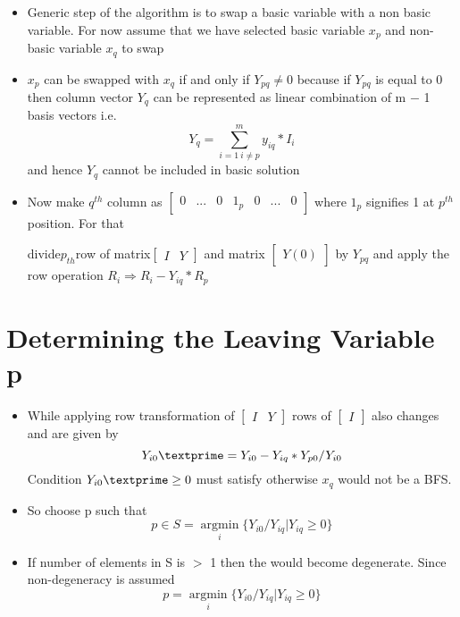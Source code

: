 \documentclass[twoside]{article}
\begin{document}
\begin{itemize}
\item Generic step of the algorithm is to swap a basic variable with a non basic variable. For now assume
that we have selected basic variable $x_p$ and non-basic variable $x_q$ to swap
\item $x_p$ can be swapped with $x_q$ if and only if $Y_{pq} \ne 0$ because if $Y_{pq}$ is equal to 0 then column vector $Y_q$
can be represented as linear combination of m − 1 basis vectors i.e.
\[ Y_q=\sum_{i=1~i \neq p}^m y_{iq} \ast I_i\]
and hence $Y_q$ cannot be included in basic solution
\item Now make $q^{th}$ column as $ \left[ \begin{array}{ccccccc}
 0 & ... & 0 & 1_p & 0 & ... & 0
  \end{array} \right]$ where $1_p$
  signifies 1 at
  $p^{th}$
  position. For that

 divide$p_{th}$row of matrix$ \left[ \begin{array}{cc}
I &
Y  \end{array} \right]$
and matrix $ \left[ \begin{array}{cc}
Y(0) \end{array} \right]$
by
$Y_{pq}$ and apply the row operation $R_i \Rightarrow R_i - Y_{iq} \ast R_p$
\end{itemize}
\section{Determining the Leaving Variable p}
\begin{itemize}
\item While applying row transformation of
$ \left[ \begin{array}{cc}
I &
Y  \end{array} \right]$ rows of $ \left[ \begin{array}{c}
I  \end{array} \right]$ also changes and are given by
\[Y_{i0}\textprime =Y_{i0}-Y_{iq}\ast Y_{p0} / Y_{i0} \]
Condition $Y_{i0}\textprime \ge 0 $ must satisfy otherwise $x_q$ would not be a BFS.
\item So choose p such that
\[p \in S = \underset{i}{\operatorname{argmin}} \{Y_{i0}/Y_{iq} | Y_{iq} \ge 0\}\]
\item If number of elements in S is $>$ 1 then the would become degenerate. Since non-degeneracy is assumed
\[p = \underset{i}{\operatorname{argmin}}\{Y_{i0}/Y_{iq} | Y_{iq} \ge 0\}\]
\end{itemize}
\end{document}
